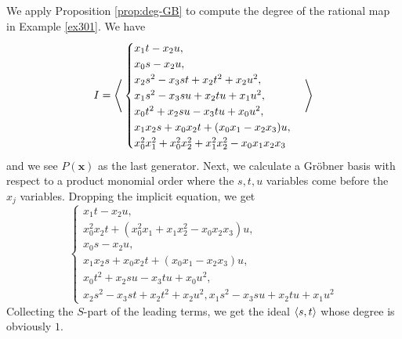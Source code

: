 \documentclass[fleqn,reqno]{amsart}
\begin{document}
\begin{example}[$\mt{ex314}$]
\label{ex314}
We apply Proposition \ref{prop:deg-GB} to compute the degree of the rational map
in Example \ref{ex301}.
We have
\[
	I=\Bigg\langle
	\begin{cases}
		{x}_{1} t-{x}_{2} u,\\{x}_{0} s-{x}_{2} u,\\{x}_{2} s^{2}-{x}_{3} s t+{x}_{2}
	     t^{2}+{x}_{2} u^{2},\\{x}_{1} s^{2}-{x}_{3} s u+{x}_{2} t u+{x}_{1} u^{2},\\{x}_{0}
	     t^{2}+{x}_{2} s u-{x}_{3} t u+{x}_{0} u^{2},\\{x}_{1} {x}_{2} s+{x}_{0} {x}_{2}
	     t+({x}_{0} {x}_{1}-{x}_{2} {x}_{3}) u,\\{x}_{0}^{2} {x}_{1}^{2}+{x}_{0}^{2}
	     {x}_{2}^{2}+{x}_{1}^{2} {x}_{2}^{2}-{x}_{0} {x}_{1} {x}_{2} {x}_{3}
	\end{cases}\Bigg\rangle
\]
and we see $P(\mathbf x)$ as the last generator.
Next, we calculate a Gr\"obner basis with respect to a product monomial order where
the $s,t,u$ variables come before the $x_j$ variables.
Dropping the implicit equation, we get
\[
	\begin{cases}
		{x}_{1} t-{x}_{2} u,\\{x}_{0}^{2}
	      {x}_{2} t+({x}_{0}^{2} {x}_{1}+{x}_{1} {x}_{2}^{2}-{x}_{0} {x}_{2} {x}_{3})
	      u,\\{x}_{0} s-{x}_{2} u,\\{x}_{1} {x}_{2} s+{x}_{0} {x}_{2} t+({x}_{0}
	      {x}_{1}-{x}_{2} {x}_{3}) u,\\{x}_{0} t^{2}+{x}_{2} s u-{x}_{3} t u+{x}_{0}
	      u^{2},\\{x}_{2} s^{2}-{x}_{3} s t+{x}_{2} t^{2}+{x}_{2} u^{2},{x}_{1}
	      s^{2}-{x}_{3} s u+{x}_{2} t u+{x}_{1} u^{2}
	\end{cases}
\]
Collecting the $S$-part of the leading terms, we get the ideal $\langle s,t\rangle$ whose degree
is obviously $1$.


\end{example}
\end{document}
